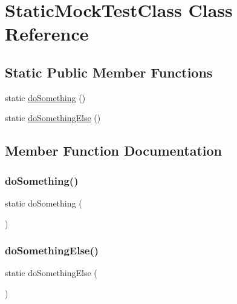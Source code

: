 \hypertarget{class_static_mock_test_class}{}\section{Static\+Mock\+Test\+Class Class Reference}
\label{class_static_mock_test_class}
\subsection*{Static Public Member Functions}
\begin{DoxyCompactItemize}
\item 
static \mbox{\hyperlink{class_static_mock_test_class_a02c2adcfe3b565aa241cf0eb6412ca53}{do\+Something}} ()
\item 
static \mbox{\hyperlink{class_static_mock_test_class_aa7404ba80b1fdbf6f21def65fdb793a0}{do\+Something\+Else}} ()
\end{DoxyCompactItemize}


\subsection{Member Function Documentation}
\mbox{\label{class_static_mock_test_class_a02c2adcfe3b565aa241cf0eb6412ca53}} 
\subsubsection{\texorpdfstring{do\+Something()}{doSomething()}}
{\footnotesize\ttfamily static do\+Something (\begin{DoxyParamCaption}{ }\end{DoxyParamCaption})\hspace{0.3cm}{\ttfamily [static]}}

\mbox{\label{class_static_mock_test_class_aa7404ba80b1fdbf6f21def65fdb793a0}} 
\subsubsection{\texorpdfstring{do\+Something\+Else()}{doSomethingElse()}}
{\footnotesize\ttfamily static do\+Something\+Else (\begin{DoxyParamCaption}{ }\end{DoxyParamCaption})\hspace{0.3cm}{\ttfamily [static]}}



